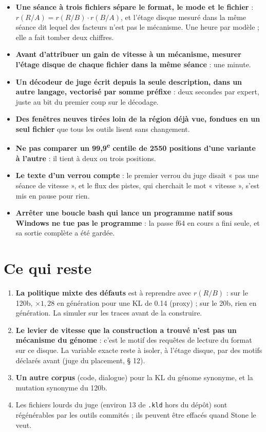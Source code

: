 \begin{itemize}
\item \textbf{Une séance à trois fichiers sépare le format, le mode et le fichier} : $r(R/A) = r(R/B)\cdot r(B/A)$, et l'étage disque mesuré dans la même séance dit lequel des facteurs n'est pas le mécanisme. Une heure par modèle ; elle a fait tomber deux chiffres.
\item \textbf{Avant d'attribuer un gain de vitesse à un mécanisme, mesurer l'étage disque de chaque fichier dans la même séance} : une minute.
\item \textbf{Un décodeur de juge écrit depuis la seule description, dans un autre langage, vectorisé par somme préfixe} : deux secondes par expert, juste au bit du premier coup sur le décodage.
\item \textbf{Des fenêtres neuves tirées loin de la région déjà vue, fondues en un seul fichier} que tous les outils lisent sans changement.
\item \textbf{Ne pas comparer un 99,9\textsuperscript{e} centile de \num{2550} positions d'une variante à l'autre} : il tient à deux ou trois positions.
\item \textbf{Le texte d'un verrou compte} : le premier verrou du juge disait « pas une séance de vitesse », et le flux des pistes, qui cherchait le mot « vitesse », s'est mis en pause pour rien.
\item \textbf{Arrêter une boucle bash qui lance un programme natif sous Windows ne tue pas le programme} : la passe f64 en cours a fini seule, et sa sortie complète a été gardée.
\end{itemize}

\section{Ce qui reste}\label{t3jug:sec:reste}

\begin{enumerate}
\item \textbf{La politique mixte des défauts} est à reprendre avec $r(R/B)$ : sur le 120b, $\times 1{,}28$ en génération pour une KL de \num{0.14} (proxy) ; sur le 20b, rien en génération. La simuler sur les traces avant de la construire.
\item \textbf{Le levier de vitesse que la construction a trouvé n'est pas un mécanisme du génome} : c'est le motif des requêtes de lecture du format sur ce disque. La variable exacte reste à isoler, à l'étage disque, par des motifs déclarés avant (juge du placement, § 12).
\item \textbf{Un autre corpus} (code, dialogue) pour la KL du génome synonyme, et la mutation synonyme du 120b.
\item Les fichiers lourds du juge (environ \SI{13}{\Go} de \texttt{.kld} hors du dépôt) sont régénérables par les outils commités ; ils peuvent être effacés quand Stone le veut.
\end{enumerate}

